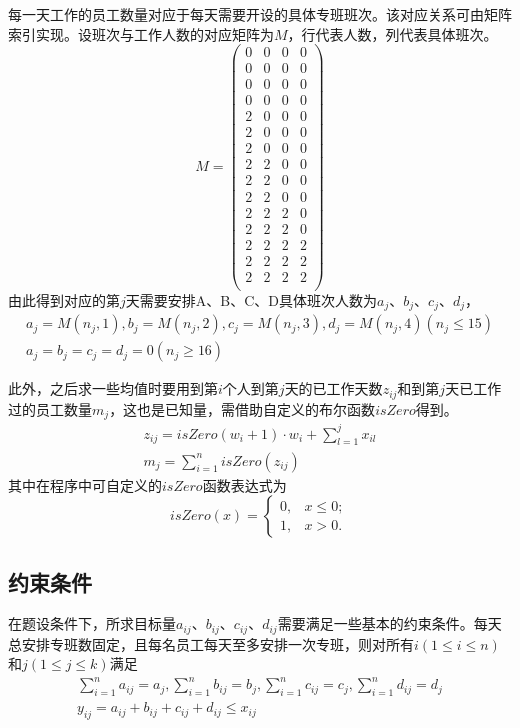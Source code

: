 \documentclass{article}
\begin{document}
	每一天工作的员工数量对应于每天需要开设的具体专班班次。该对应关系可由矩阵索引实现。设班次与工作人数的对应矩阵为$M$，行代表人数，列代表具体班次。
	\begin{equation}
		M=	\begin{pmatrix}
			0&0&0&0\\
			0&0&0&0\\
			0&0&0&0\\
			0&0&0&0\\
			2&0&0&0\\
			2&0&0&0\\
			2&0&0&0\\
			2&2&0&0\\
			2&2&0&0\\
			2&2&0&0\\
			2&2&2&0\\
			2&2&2&0\\
			2&2&2&2\\
			2&2&2&2\\
			2&2&2&2\\
		\end{pmatrix}
	\end{equation}
	由此得到对应的第$j$天需要安排A、B、C、D具体班次人数为$a_j$、$b_j$、$c_j$、$d_j$，
	\begin{gather}
		a_j=M(n_j,1),b_j=M(n_j,2),c_j=M(n_j,3),d_j=M(n_j,4)(n_j\leq15)\\
		a_j=b_j=c_j=d_j=0(n_j\geq16)	
	\end{gather}
	
	此外，之后求一些均值时要用到第$i$个人到第$j$天的已工作天数$z_{ij}$和到第$j$天已工作过的员工数量$m_{j}$，这也是已知量，需借助自定义的布尔函数$isZero$得到。
	\begin{gather}
		z_{ij}=isZero(w_i+1)\cdot w_i+\sum_{l=1}^{j}x_{il}\\
		m_j=\sum_{i=1}^{n}isZero(z_{ij})
	\end{gather}
	其中在程序中可自定义的$isZero$函数表达式为
	\begin{equation}
		isZero(x) = \begin{cases}
			0, & x\leq 0; \\
			1, & x>0.
		\end{cases}
	\end{equation}
	
	\subsection{约束条件}
	在题设条件下，所求目标量$a_{ij}$、$b_{ij}$、$c_{ij}$、$d_{ij}$需要满足一些基本的约束条件。每天总安排专班数固定，且每名员工每天至多安排一次专班，则对所有$i(1\leq i \leq n)$和$j(1\leq j\leq k)$满足
	\begin{gather}
		\sum_{i=1}^{n}a_{ij}=a_j,
		\sum_{i=1}^{n}b_{ij}=b_j,
		\sum_{i=1}^{n}c_{ij}=c_j,
		\sum_{i=1}^{n}d_{ij}=d_j\\
		y_{ij}=a_{ij}+b_{ij}+c_{ij}+d_{ij}\leq x_{ij}
	\end{gather}
	
\end{document}
